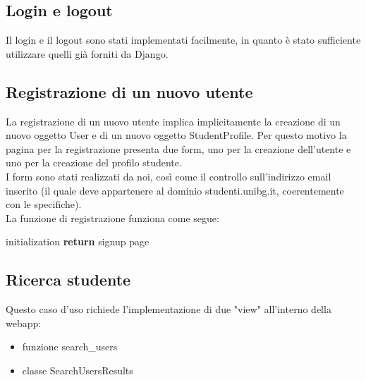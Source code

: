 \documentclass[10pt,a4paper]{report}
\begin{document}
	\subsection{Login e logout}
	Il login e il logout sono stati implementati facilmente, in quanto è stato sufficiente utilizzare quelli già forniti da Django.
	
	\subsection{Registrazione di un nuovo utente}
	La registrazione di un nuovo utente implica implicitamente la creazione di un nuovo oggetto User e di un nuovo oggetto StudentProfile. Per questo motivo la pagina per la registrazione presenta due form, uno per la creazione dell'utente e uno per la creazione del profilo studente. \\
	I form sono stati realizzati da noi, così come il controllo sull'indirizzo email inserito (il quale deve appartenere al dominio studenti.unibg.it, coerentemente con le specifiche). \\
	La funzione di registrazione funziona come segue: \\
	
	\begin{algorithm}[H]
		initialization\;
		\textbf{return} signup page
	\end{algorithm}

	\subsection{Ricerca studente}
	Questo caso d'uso richiede l'implementazione di due "view" all'interno della webapp:
	\begin{itemize}
		\item funzione search\_users
		\item classe SearchUsersResults
	\end{itemize}
\end{document}
